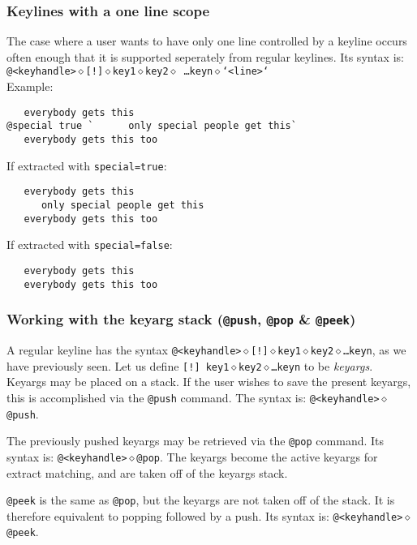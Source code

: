 \subsubsection{Keylines with a one line scope}
The case where a user wants to have only one line controlled by a keyline
occurs often enough that it is supported seperately from regular keylines.  
Its syntax is: {\tt @<keyhandle>$\diamond$[!]$\diamond$key1$\diamond$key2$\diamond$
\ldots keyn$\diamond$`<line>`}\\

\noindent
Example:
\begin{verbatim}
   everybody gets this
@special true `      only special people get this`
   everybody gets this too
\end{verbatim}

\noindent
If extracted with {\tt special=true}:
\begin{verbatim}
   everybody gets this
      only special people get this
   everybody gets this too
\end{verbatim}

\noindent
If extracted with {\tt special=false}:
\begin{verbatim}
   everybody gets this
   everybody gets this too
\end{verbatim}

\subsubsection{Working with the keyarg stack ({\tt @push}, {\tt @pop} \& {\tt @peek})}

A regular keyline has the syntax
{\tt @<keyhandle>$\diamond$[!]$\diamond$key1$\diamond$key2$\diamond$\ldots keyn},
as we have previously seen.  Let us define 
{\tt [!] key1$\diamond$key2$\diamond$\ldots keyn} to be {\em keyargs}.  Keyargs
may be placed on a stack.  If the user wishes to save the present keyargs,
this is accomplished via the {\tt @push} command.  The syntax is:
{\tt @<keyhandle>$\diamond$@push}.

The previously pushed keyargs may be retrieved via the {\tt @pop} command.  
Its syntax is:
{\tt @<keyhandle>$\diamond$@pop}.  The keyargs become the active keyargs for 
extract matching, and are taken off of the keyargs stack.

{\tt @peek} is the same as {\tt @pop}, but the keyargs are not taken off of
the stack.  It is therefore equivalent to popping followed by a push.  Its
syntax is: {\tt @<keyhandle>$\diamond$@peek}.

